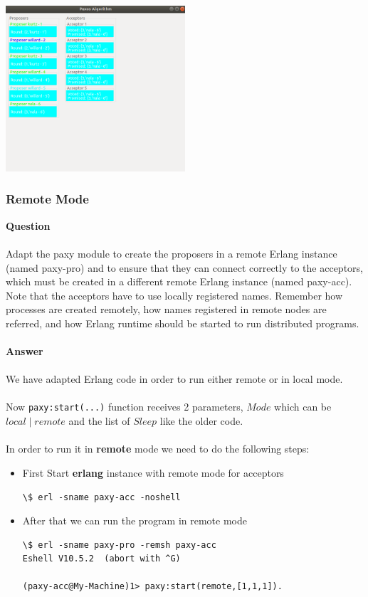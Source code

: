 \documentclass[a4paper, 10pt]{article}
\begin{document}
\begin{minipage}[t]{\linewidth}
  \centering
   \includegraphics[width=0.5\textwidth]{6Proposers}
\end{minipage}
\subsubsection{Remote Mode}
\textbf{\large{Question}}\\\\
Adapt the paxy module to create the proposers in a remote Erlang instance (named paxy-pro) and to ensure that they can connect correctly to the acceptors, which must be created in a different remote Erlang instance (named paxy-acc). Note that the acceptors have to use locally registered names. Remember how processes are created remotely, how names registered in remote nodes are referred, and how Erlang runtime should be started to run distributed programs.
\\\\
\textbf{\large{Answer}}\\\\
We have adapted Erlang code in order to run either remote or in local mode.
\\\\
Now \lstinline|paxy:start(...)| function receives 2 parameters, $Mode$ which can
be $local \mid remote$ and the list of $Sleep$ like the older code.
\\\\
In order to run it in \textbf{remote} mode we need to do the following steps:

\begin{itemize}
  \item First Start \textbf{erlang} instance with remote mode for acceptors

\begin{lstlisting}
\$ erl -sname paxy-acc -noshell   
\end{lstlisting}

\item After that we can run the program in remote mode

\begin{lstlisting}
\$ erl -sname paxy-pro -remsh paxy-acc
Eshell V10.5.2  (abort with ^G)

(paxy-acc@My-Machine)1> paxy:start(remote,[1,1,1]).
\end{lstlisting}
      
\end{itemize}
\end{document}
